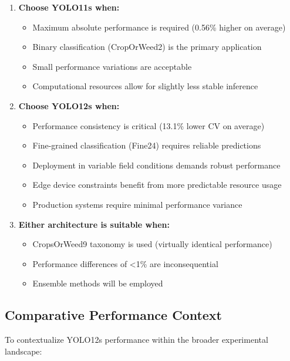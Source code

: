 \begin{enumerate}
    \item \textbf{Choose YOLO11s when:}
    \begin{itemize}
        \item Maximum absolute performance is required (0.56\% higher on average)
        \item Binary classification (CropOrWeed2) is the primary application
        \item Small performance variations are acceptable
        \item Computational resources allow for slightly less stable inference
    \end{itemize}
    
    \item \textbf{Choose YOLO12s when:}
    \begin{itemize}
        \item Performance consistency is critical (13.1\% lower CV on average)
        \item Fine-grained classification (Fine24) requires reliable predictions
        \item Deployment in variable field conditions demands robust performance
        \item Edge device constraints benefit from more predictable resource usage
        \item Production systems require minimal performance variance
    \end{itemize}
    
    \item \textbf{Either architecture is suitable when:}
    \begin{itemize}
        \item CropsOrWeed9 taxonomy is used (virtually identical performance)
        \item Performance differences of <1\% are inconsequential
        \item Ensemble methods will be employed
    \end{itemize}
\end{enumerate}

\subsection{Comparative Performance Context}

To contextualize YOLO12s performance within the broader experimental landscape:

